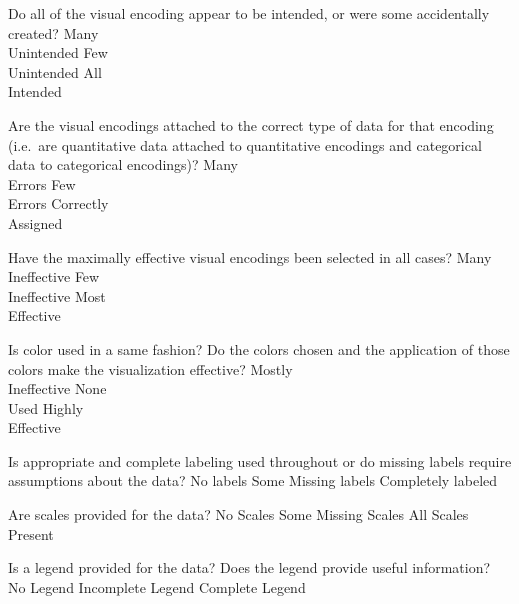 \documentclass[a4paper,12pt]{article}
\begin{document}
	{Do all of the visual encoding appear to be intended, or were some accidentally created?}
        {\choice Many\\Unintended}
        {\choice Few\\Unintended}
        {\choice All\\Intended} 
        
	{Are the visual encodings attached to the correct type of data for that 
    	encoding (i.e.\ are quantitative data attached to quantitative 
        encodings and categorical data to categorical encodings)?}
    {\choice Many\\Errors}
    {\choice Few\\Errors}
    {\choice Correctly\\Assigned} 
            
	{Have the maximally effective visual encodings been selected in all cases? }
    {\choice Many\\Ineffective}
    {\choice Few\\Ineffective}
    {\choice Most\\Effective} 
        
	{Is color used in a same fashion? Do the colors chosen and the application 
    	of those colors make the visualization effective?}
    {\choice Mostly\\Ineffective}
    {\choice None\\Used}
    {\choice Highly\\Effective} 

\EndTable  

\vspace{15pt}


   	{Is appropriate and complete labeling used throughout or do 
      	missing labels require assumptions about the data?}
    {\choice No labels}
    {\choice Some Missing labels}
    {\choice Completely labeled} 
        
   	{Are scales provided for the data?}
	{\choice No Scales}
	{\choice Some Missing Scales}
	{\choice All Scales Present} 

	{Is a legend provided for the data? Does the legend provide useful 
    	information?}
	{\choice No Legend}
	{\choice Incomplete Legend}
	{\choice Complete Legend} 
        
\end{document}
